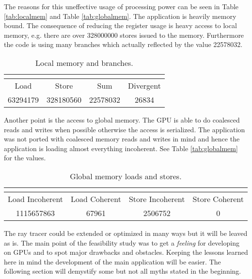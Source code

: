 The reasons for this uneffective usage of processing power can be seen in Table \autoref{tab:localmem} and Table \autoref{tab:globalmem}. The application is heavily memory bound. The consequence of reducing the register usage is heavy access to local memory, e.g. there are over 328000000 stores issued to the memory. Furthermore the code is using many branches which actually reflected by the value 22578032. 

\begin{table}[ht]
    \myfloatalign
  \begin{tabularx}{\textwidth}{cccc} \toprule
	\multicolumn{2}{c}{\slcsmallcaps{Local Memory}} &
	\multicolumn{2}{c}{\slcsmallcaps{Branches}} \\ \midrule
    Load & Store & Sum & Divergent\\
	63294179 & 328180560 & 22578032 & 26834\\
    \bottomrule
  \end{tabularx}
  \caption[Local memory and branches]{Local memory and branches.}
  \label{tab:localmem}
\end{table}

Another point is the access to global memory. The \gls{GPU} is able to do coalesced reads and writes when possible otherwise the access is serialized. 
The application was not ported with coalesced memory reads and writes in mind and hence the application is loading almost everything incoherent. See Table \autoref{tab:globalmem} for the values. 

\begin{table}[ht]
    \myfloatalign
  \begin{tabularx}{\textwidth}{cccc} \toprule
	\multicolumn{4}{c}{\slcsmallcaps{Global Memory}} \\ \midrule
    Load Incoherent & Load Coherent & Store Incoherent & Store Coherent \\
	1115657863 & 67961 & 2506752 & 0 \\
    \bottomrule
  \end{tabularx}
  \caption[Global memory loads and stores]{Global memory loads and stores.}
  \label{tab:globalmem}
\end{table}

The ray tracer could be extended or optimized in many ways but it will be leaved as is. The main point of the feasibility study was to get a \emph{feeling} for developing on \glspl{GPU} and to spot major drawbacks and obstacles. Keeping the lessons learned here in mind the development of the main application will be easier. The following section will demystify some but not all myths stated in the beginning.

